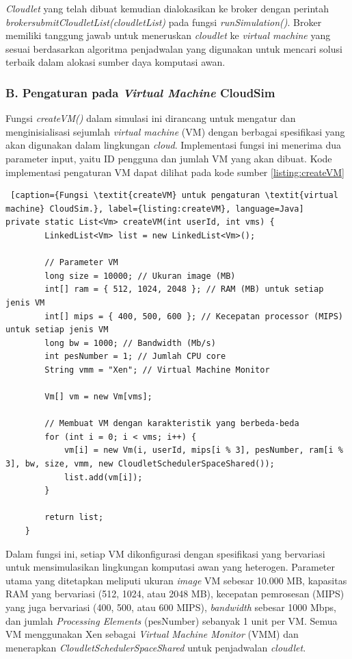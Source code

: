 \textit{Cloudlet} yang telah dibuat kemudian dialokasikan ke broker dengan perintah \textit{brokersubmitCloudletList(cloudletList)} pada fungsi \textit{runSimulation()}. Broker memiliki tanggung jawab untuk meneruskan \textit{cloudlet} ke \textit{virtual machine} yang sesuai berdasarkan algoritma penjadwalan yang digunakan untuk mencari solusi terbaik dalam alokasi sumber daya komputasi awan.

\subsubsection{B. Pengaturan pada \textit{Virtual Machine} CloudSim}
Fungsi \textit{createVM()} dalam simulasi ini dirancang untuk mengatur dan menginisialisasi sejumlah \textit{virtual machine} (VM) dengan berbagai spesifikasi yang akan digunakan dalam lingkungan \textit{cloud}. Implementasi fungsi ini menerima dua parameter input, yaitu ID pengguna dan jumlah VM yang akan dibuat. Kode implementasi pengaturan VM dapat dilihat pada kode sumber \ref{listing:createVM}

\begin{lstlisting} [caption={Fungsi \textit{createVM} untuk pengaturan \textit{virtual machine} CloudSim.}, label={listing:createVM}, language=Java]
private static List<Vm> createVM(int userId, int vms) {
        LinkedList<Vm> list = new LinkedList<Vm>();

        // Parameter VM
        long size = 10000; // Ukuran image (MB)
        int[] ram = { 512, 1024, 2048 }; // RAM (MB) untuk setiap jenis VM
        int[] mips = { 400, 500, 600 }; // Kecepatan processor (MIPS) untuk setiap jenis VM
        long bw = 1000; // Bandwidth (Mb/s)
        int pesNumber = 1; // Jumlah CPU core
        String vmm = "Xen"; // Virtual Machine Monitor

        Vm[] vm = new Vm[vms];

        // Membuat VM dengan karakteristik yang berbeda-beda
        for (int i = 0; i < vms; i++) {
            vm[i] = new Vm(i, userId, mips[i % 3], pesNumber, ram[i % 3], bw, size, vmm, new CloudletSchedulerSpaceShared());
            list.add(vm[i]);
        }

        return list;
    }
\end{lstlisting}

Dalam fungsi ini, setiap VM dikonfigurasi dengan spesifikasi yang bervariasi untuk mensimulasikan lingkungan komputasi awan yang heterogen. Parameter utama yang ditetapkan meliputi ukuran \textit{image} VM sebesar 10.000 MB, kapasitas RAM yang bervariasi (512, 1024, atau 2048 MB), kecepatan pemrosesan (MIPS) yang juga bervariasi (400, 500, atau 600 MIPS), \textit{bandwidth} sebesar 1000 Mbps, dan jumlah \textit{Processing Elements} (pesNumber) sebanyak 1 unit per VM. Semua VM menggunakan Xen sebagai \textit{Virtual Machine Monitor} (VMM) dan menerapkan \textit{CloudletSchedulerSpaceShared} untuk penjadwalan \textit{cloudlet}.

